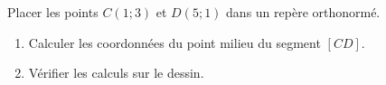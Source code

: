 
\begin{exercice}\label{exosmath-0484}

    Placer les points \( C(1;3)\) et \( D(5;1)\) dans un repère orthonormé.
    \begin{enumerate}
        \item
            Calculer les coordonnées du point milieu du segment \( [CD]\).
        \item
            Vérifier les calculs sur le dessin.
    \end{enumerate}

\end{exercice}
